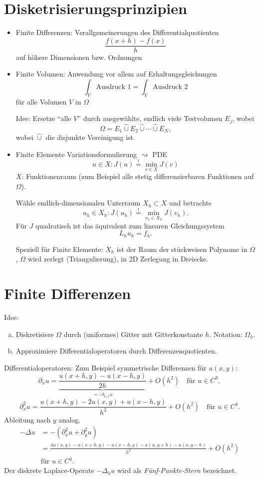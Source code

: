 \section{Disketrisierungsprinzipien} %
\begin{itemize}
\item Finite Differenzen: Verallgemeinerungen des Differentialquotienten
  \[ \frac{f(x+h) - f(x)}{h} \]
  auf höhere Dimensionen bzw. Ordnungen
\item Finite Volumen: Anwendung vor allem auf Erhaltungsgleichungen
  \[ \int_V \text{Ausdruck } 1 = \int_V \text{Ausdruck } 2 \]
  für alle Volumen $V$ in $\Omega$

  Idee: Ersetze ``alle $V$'' durch ausgewählte, endlich viele Testvolumen $E_j$,
  wobei
  \[ \Omega = E_1 \hat{\cup} E_2 \hat{\cup} \cdots \hat{\cup} E_N, \]
  wobei $\hat{\cup}$ die disjunkte Vereinigung ist.
\item Finite Elemente
  Variationsformulierung $\rightsquigarrow$ PDE
  \[ u \in X : J(u) \overset{!}{=} \min_{v \in X} J(v) \]
  $X$: Funktionenraum (zum Beispiel alle stetig differenzierbaren Funktionen auf
  $\Omega$).

  Wähle endlich-dimensionalen Unterraum $X_h \subset X$ und betrachte
  \[ u_h \in X_h : J(u_h) \overset{!}{=} \min_{v_h \in X_h} J(v_h). \]
  Für $J$ quadratisch ist das äquivalent zum linearen Gleichungssystem
  \[ L_h u_h = f_h. \]

  Speziell für Finite Elemente: $X_h$ ist der Raum der stückweisen Polynome in
  $\Omega$, $\Omega$ wird zerlegt (Triangulierung), in 2D Zerlegung in Dreiecke.
\end{itemize}

\section{Finite Differenzen}
Idee:
\begin{enumerate}[a)]
\item Diskretisiere $\Omega$ durch (uniformes) Gitter mit Gitterkonstante $h$.
  Notation: $\Omega_h$.
\item Approximiere Differentialoperatoren durch Differenzenquotienten.
\end{enumerate}

Differentialoperatoren: Zum Beispiel symmetrische Differenzen für $u(x,y)$:
\[ \partial_x u =
  \underbrace{\frac{u(x+h,y) - u(x-h,y)}{2h}}_{=: \partial_{h,x} u} + O(h^2)
  \quad \text{für } u \in C^3, \]
\[ \partial_x^2 u = \frac{u(x+h,y) - 2 u(x,y) + u(x - h,y)}{h^2} + O(h^2)
  \quad \text{für } u \in C^4. \]
Ableitung nach $y$ analog.
\begin{align*}
  - \Delta u &= -(\partial_x^2 u + \partial_y^2 u) \\
             &= \frac{4 u(x,y) - u(x+h,y) - u(x-h,y) - x(x,y+h) - u(x,y-h)}
               {h^2} + O(h^2) \\
             &\text{für } u \in C^4.
\end{align*}
Der diskrete Laplace-Operate $- \Delta_h u$ wird als \emph{Fünf-Punkte-Stern}
bezeichnet.

